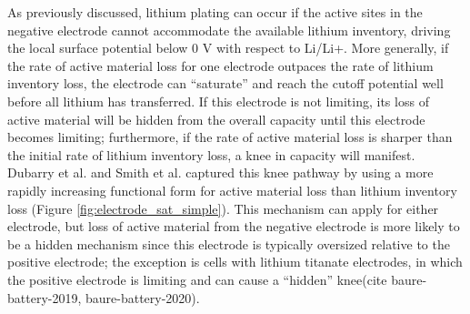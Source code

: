 \documentclass[journal=jpclcd,manuscript=article]{achemso}
\begin{document}
As previously discussed, lithium plating can occur if the active sites in the negative electrode cannot accommodate the available lithium inventory, driving the local surface potential below 0 V with respect to Li/Li+. More generally, if the rate of active material loss for one electrode outpaces the rate of lithium inventory loss, the electrode can ``saturate'' and reach the cutoff potential well before all lithium has transferred. If this electrode is not limiting, its loss of active material will be hidden from the overall capacity until this electrode becomes limiting; furthermore, if the rate of active material loss is sharper than the initial rate of lithium inventory loss, a knee in capacity will manifest. Dubarry et al.\cite{dubarry_synthesize_2012} and Smith et al.\cite{smith_life_2017} captured this knee pathway by using a more rapidly increasing functional form for active material loss than lithium inventory loss (Figure \ref{fig:electrode_sat_simple}). This mechanism can apply for either electrode, but loss of active material from the negative electrode is more likely to be a hidden mechanism since this electrode is typically oversized relative to the positive electrode; the exception is cells with lithium titanate electrodes, in which the positive electrode is limiting and can cause a ``hidden'' knee(cite baure-battery-2019, baure-battery-2020).
\end{document}
